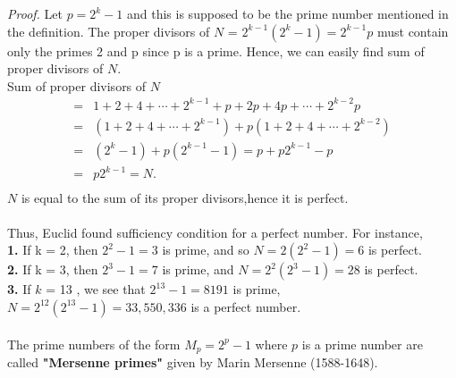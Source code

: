 \documentclass[a4paper,11pt]{article}
\begin{document}
\noindent \textit{Proof.} Let $p = 2^
k - 1 $ and this is supposed to be the prime number mentioned in the definition. The 
proper divisors of $N$ = $2^
{k-1}(2^k - 1) = 2^{
k
- 1}p$ must  contain only 
the primes 2 and p since p is a prime. Hence, we can easily find sum of proper divisors of $N$. \\
\newpage
Sum of proper divisors of $ N $
\begin{align*}
=& 1 + 2 + 4 +\cdots + 2^{k- 1} + p + 2p + 4p + \cdots + 2^{k-2} p \\
=& (1 + 2 + 4 + \cdots+ 2^{k- 1}) + p(1 + 2 + 4 + \cdots+ 2^{k-2})\\
=& (2^k -1) + p(2^{k- 1}- 1) = p + p2^{k- 1} - p \\
=& p2^{k- 1} = N.\\
\end{align*}
$ N $ is equal to the sum of its proper divisors,hence it is perfect.\\
\\
Thus, Euclid found sufficiency condition for a perfect number. For instance,\\ \textbf{1.} If k = 2, then $2^
2 -1 = 3$ is prime, and so $N= 2(2^2 -1) = 
6$ is perfect.\\ \textbf{2.} If k = 3, then $2^
3 - 1 = 7$ is prime, and 
$N = 2^2(2^3 -1) = 28$ is perfect.\\ \textbf{3.} If $k$ = 13 , we see that $2^{13}-1 = 8191$ is prime, 
 $ N = 2^{12}(2^{13}-1) = 33,550,336$ is a perfect number.\\
  \\
The prime numbers of the form $M_{p} = 2^p - 1$ where $p$ is a prime number are called \textbf{"Mersenne primes"} given by Marin
Mersenne (1588-1648). \\
\end{document}
